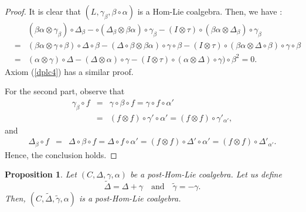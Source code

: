 \documentclass{article}
\newtheorem{prop}[thm]{Proposition}
\theoremstyle{definition}
\theoremstyle{remark}
\numberwithin{equation}{section}
\begin{document}
\begin{proof}
 It is clear that $(L,\gamma_\beta, \beta\circ\alpha)$ is a Hom-Lie coalgebra. Then,
 we have :
\begin{eqnarray}
 &&(\beta\alpha\otimes\gamma_\beta)\circ\Delta_\beta-\circ(\Delta_\beta\otimes\beta\alpha)\circ\gamma_\beta -(I\otimes \tau)\circ(\beta\alpha\otimes\Delta_\beta)\circ\gamma_\beta\nonumber\\
&=&(\beta\alpha\otimes\gamma\circ\beta)\circ\Delta\circ\beta-(\Delta\circ\beta\otimes\beta\alpha)\circ\gamma\circ\beta -(I\otimes \tau)\circ(\beta\alpha\otimes\Delta\circ\beta)\circ\gamma\circ\beta\nonumber\\
&=&(\alpha\otimes\gamma)\circ\Delta-(\Delta\otimes\alpha)\circ\gamma -(I\otimes \tau)\circ(\alpha\otimes\Delta)\circ\gamma)\circ\beta^2=0\nonumber.
\end{eqnarray}
Axiom (\ref{dplc4}) has a similar proof.

For the second part, observe that
\begin{eqnarray}
 \gamma_\beta\circ f\!\!\!&=&\!\!\!\!\gamma\circ\beta\circ f=\gamma\circ f\circ\alpha'\nonumber\\
&=&(f\otimes f)\circ \gamma'\circ\alpha'
=(f\otimes f)\circ\gamma'_{\alpha'},\label{ccc}\nonumber
\end{eqnarray}
 and
\begin{eqnarray}
\Delta_\beta\circ f\!\!\!\!&=&\!\!\!\!\Delta\circ\beta\circ f=\Delta\circ f\circ\alpha'
=(f\otimes f)\circ \Delta'\circ\alpha'=(f\otimes f)\circ\Delta'_{\alpha'}\nonumber.
\end{eqnarray}
Hence, the conclusion holds.
\end{proof}
\begin{prop}
 Let $(C, \Delta, \gamma, \alpha)$ be a post-Hom-Lie coalgebra. Let us define
$$\tilde\Delta=\Delta+\gamma\quad\mbox{and}\quad\tilde\gamma=-\gamma.$$
Then, $(C, \tilde\Delta, \tilde\gamma, \alpha)$ is a post-Hom-Lie coalgebra.
\end{prop}
\end{document}
